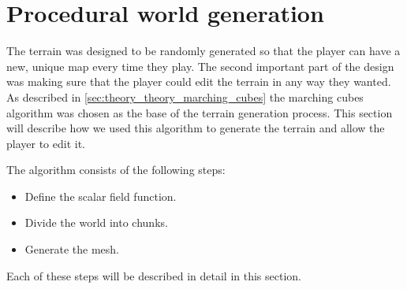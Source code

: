 \section{Procedural world generation} \label{sec:implementation_terrain}
The terrain was designed to be randomly generated so that the player can have a new, unique map every time they play.
The second important part of the design was making sure that the player could edit the terrain in any way they wanted.
As described in \autoref{sec:theory_theory_marching_cubes} the marching cubes algorithm was chosen as the base of the terrain generation process.
This section will describe how we used this algorithm to generate the terrain and allow the player to edit it.

The algorithm consists of the following steps:
\begin{itemize}
    \item Define the scalar field function.
    \item Divide the world into chunks.
    \item Generate the mesh.
\end{itemize}

Each of these steps will be described in detail in this section.






